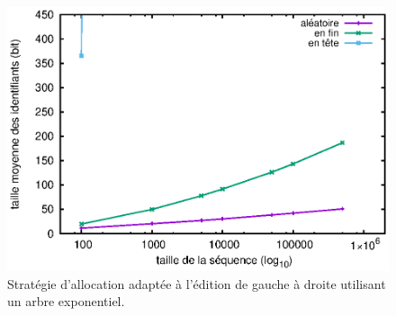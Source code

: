 
\begin{figure}
  \centering
  \includegraphics[width=.8\textwidth]{./img/lseq/double.eps}
  \caption{\label{fig:lseq:double}Stratégie d'allocation adaptée à l'édition de
    gauche à droite utilisant un arbre exponentiel.}
\end{figure}

\ \\

